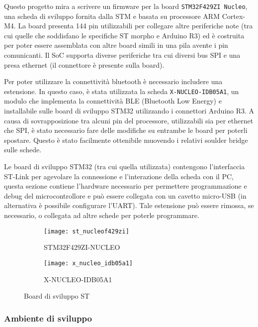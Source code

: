 Questo progetto mira a scrivere un firmware per la board \texttt{STM32F429ZI Nucleo}, una scheda di sviluppo fornita dalla STM e basata su processore ARM Cortex-M4. La board presenta 144 pin utilizzabili per collegare altre periferiche note (tra cui quelle che soddisfano le specifiche ST morpho e Arduino R3) ed \`e costruita per poter essere assemblata con altre board simili in una pila avente i pin comunicanti. Il SoC supporta diverse periferiche tra cui diversi bus SPI e una presa ethernet (il connettore \`e presente sulla board).

Per poter utilizzare la connettivit\`a bluetooth \`e necessario includere una estensione. In questo caso, \`e stata utilizzata la scheda \texttt{X-NUCLEO-IDB05A1}, un modulo che implementa la connettivit\`a BLE (Bluetooth Low Energy) e installabile sulle board di sviluppo STM32 utilizzando i connettori Arduino R3. A causa di sovrapposizione tra alcuni pin del processore, utilizzabili sia per ethernet che SPI, \`e stato necessario fare delle modifiche su entrambe le board per poterli spostare. Questo \`e stato facilmente ottenibile muovendo i relativi soulder bridge sulle schede.

Le board di sviluppo STM32 (tra cui quella utilizzata) contengono l'interfaccia ST-Link per agevolare la connessione e l'interazione della scheda con il PC, questa sezione contiene l'hardware necessario per permettere programmazione e debug del microcontrollore e pu\`o essere collegata con un cavetto micro-USB (in alternativa \`e possibile configurare l'UART). Tale estensione pu\`o essere rimossa, se necessario, o collegata ad altre schede per poterle programmare.

\begin{figure}[ht]
  \center
  \begin{subfigure}{.45\textwidth}
    \texttt{[image: st\_nucleof429zi]}
    \caption{STM32F429ZI-NUCLEO}
  \end{subfigure}
  \hfill
  \begin{subfigure}{.45\textwidth}
    \texttt{[image: x\_nucleo\_idb05a1]}
    \caption{X-NUCLEO-IDB05A1}
  \end{subfigure}
  \caption{Board di sviluppo ST}
  \label{fig:boards}
\end{figure}

\subsubsection{Ambiente di sviluppo}

